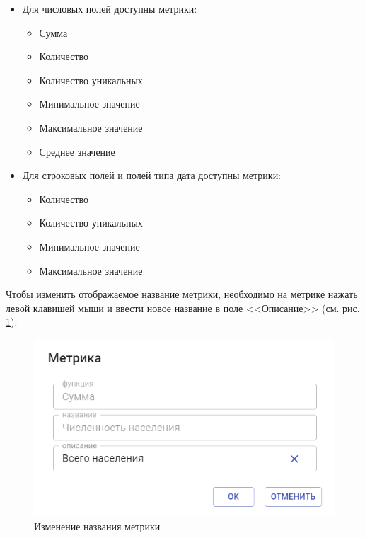 \documentclass[../user-manual.tex]{subfiles}
\begin{document}
	\begin{itemize}
		
		\item Для числовых полей доступны метрики:
			\begin{itemize}
				
				\item Сумма
				
				\item Количество
				
				\item Количество уникальных
				
				\item Минимальное значение
				
				\item Максимальное значение
				
				\item Среднее значение
			\end{itemize}
	
		\item Для строковых полей и полей типа дата доступны метрики:
			\begin{itemize}
			
				\item Количество
				
				\item Количество уникальных
			
				\item Минимальное значение
			
				\item Максимальное значение
			\end{itemize}
	
	\end{itemize}

	Чтобы изменить отображаемое название метрики, необходимо на метрике нажать левой клавишей мыши и ввести новое название в поле <<Описание>> (см. рис. \ref{fig:change-name}).
	
	\begin{figure}[h]
		\centering
		\includegraphics[width=\graphicswidth]{img/7-change-metrics-name.png}
		\caption{Изменение названия метрики}
		\label{fig:change-name}
	\end{figure}
\end{document}
